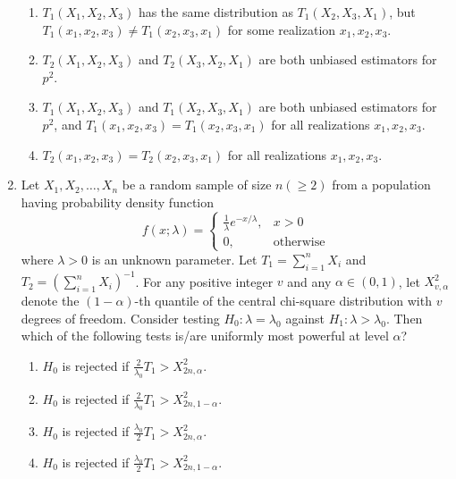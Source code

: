 \documentclass[journal,12pt,onecolumn]{IEEEtran}
\theoremstyle{remark}
\begin{document}
\begin{enumerate}
    \begin{enumerate}
        \item $T_1(X_1, X_2, X_3)$ has the same distribution as $T_1(X_2, X_3, X_1)$, but $T_1(x_1, x_2, x_3) \neq T_1(x_2, x_3, x_1)$ for some realization $x_1, x_2, x_3$.
        \item $T_2(X_1, X_2, X_3)$ and $T_2(X_3, X_2, X_1)$ are both unbiased estimators for $p^2$.
        \item $T_1(X_1, X_2, X_3)$ and $T_1(X_2, X_3, X_1)$ are both unbiased estimators for $p^2$, and $T_1(x_1, x_2, x_3) = T_1(x_2, x_3, x_1)$ for all realizations $x_1, x_2, x_3$.
        \item $T_2(x_1, x_2, x_3) = T_2(x_2, x_3, x_1)$ for all realizations $x_1, x_2, x_3$.
    \end{enumerate}
    \item Let $X_1, X_2, \dots, X_n$ be a random sample of size $n (\geq 2)$ from a population having probability density function
\[
    f(x; \lambda) = \begin{cases} 
        \frac{1}{\lambda} e^{-x/\lambda}, & x > 0 \\ 
        0, & \text{otherwise} 
    \end{cases}
\]
    where $\lambda > 0$ is an unknown parameter. Let $T_1 = \sum_{i=1}^{n} X_i$ and $T_2 = \left(\sum_{i=1}^{n} X_i\right)^{-1}$. For any positive integer $v$ and any $\alpha \in (0, 1)$, let $X_{v,\alpha}^2$ denote the $(1 - \alpha)$-th quantile of the central chi-square distribution with $v$ degrees of freedom. Consider testing $H_0: \lambda = \lambda_0$ against $H_1: \lambda > \lambda_0$. Then which of the following tests is/are uniformly most powerful at level $\alpha$?
    \begin{enumerate}
        \item $H_0$ is rejected if $\frac{2}{\lambda_0}T_1  > X_{2n, \alpha}^2$.
        \item $H_0$ is rejected if $\frac{2}{\lambda_0}T_1> X_{2n, 1 - \alpha}^2$.
        \item $H_0$ is rejected if $\frac{\lambda_0}{2}T_1 > X_{2n, \alpha}^2$.
        \item $H_0$ is rejected if $\frac{\lambda_0}{2}T_1> X_{2n, 1 - \alpha}^2$.
    \end{enumerate}
    

\end{enumerate}
\end{document}
